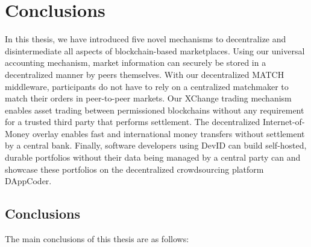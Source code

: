 \chapter{Conclusions}
\label{conclusion}

In this thesis, we have introduced five novel mechanisms to decentralize and disintermediate all aspects of blockchain-based marketplaces.
Using our universal \TrustChain{} accounting mechanism, market information can securely be stored in a decentralized manner by peers themselves.
With our decentralized MATCH middleware, participants do not have to rely on a centralized matchmaker to match their orders in peer-to-peer markets.
Our XChange trading mechanism enables asset trading between permissioned blockchains without any requirement for a trusted third party that performs settlement.
The decentralized Internet-of-Money overlay enables fast and international money transfers without settlement by a central bank.
Finally, software developers using DevID can build self-hosted, durable portfolios without their data being managed by a central party can and showcase these portfolios on the decentralized crowdsourcing platform DAppCoder.

\section{Conclusions}
The main conclusions of this thesis are as follows:

